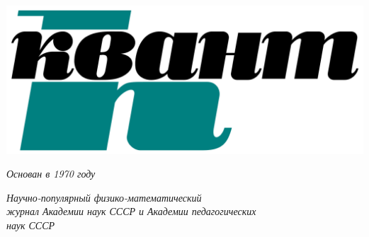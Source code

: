 
\pagestyle{fancy}
\fancyhf{}
\renewcommand{\headrulewidth}{0pt}
\fancyfoot[RO]{\textbf{\LARGE\thepage}}
\noindent

\begin{minipage}[t][][t]{0.45\linewidth}
\begin{Biglogo}
\raggedright
\includegraphics[width=0.7\linewidth]{Kvant_logo}

\smallskip
\fontsize{9dd}{7dd}\selectfont
\raggedright
\textit{Основан в 1970 году}
\end{Biglogo}
\fontsize{8dd}{7dd}\selectfont
\raggedright
\itshape Научно-популярный физико-математический\\ журнал Академии наук СССР и Академии педагогических\\ наук СССР


\end{minipage}
